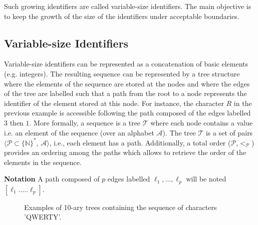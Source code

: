 Such growing identifiers are called variable-size identifiers. The main
objective is to keep the growth of the size of the identifiers under acceptable
boundaries.

\subsection{Variable-size Identifiers}
\label{subsec:variable}

Variable-size identifiers can be represented as a concatenation of basic
elements (e.g. integers). The resulting sequence can be represented by a tree
structure where the elements of the sequence are stored at the nodes and where
the edges of the tree are labelled such that a path from the root to a node
represents the identifier of the element stored at this node. For instance, the
character $R$ in the previous example is accessible following the path composed
of the edges labelled $3$ then $1$. More formally, a sequence is a tree
$\mathcal{T}$ where each node contains a value i.e. an element of the sequence
(over an alphabet $\mathcal{A}$). The tree $\mathcal{T}$ is a set of pairs
$\langle\mathcal{P}\subset\{\mathbb{N}\}^*,\, \mathcal{A} \rangle$, i.e., each
element has a path. Additionally, a total order
($\mathcal{P}$,$<_{\mathcal{P}}$) provides an ordering among the paths which
allows to retrieve the order of the elements in the sequence.

\noindent \textbf{Notation} A path composed of $p$ edges labelled
$\ell_1,\ldots,\ell_p$ will be noted $[\ell_1.\ldots.\ell_p]$.

\begin{figure*}
  \centering
  \hspace{20pt}
  \caption{\label{fig:treeexample} Examples of 10-ary trees containing the
    sequence of characters 'QWERTY'.}
\end{figure*}


